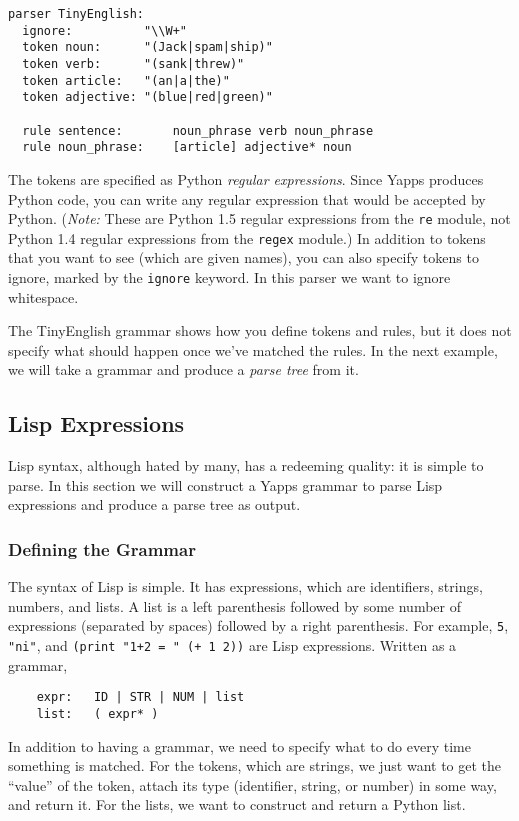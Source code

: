 \documentclass[10pt]{article}
\newcommand{\mysubsection}[1]{\subsection{#1}}
\begin{document}
\begin{verbatim}
parser TinyEnglish:
  ignore:          "\\W+"
  token noun:      "(Jack|spam|ship)"
  token verb:      "(sank|threw)"
  token article:   "(an|a|the)"
  token adjective: "(blue|red|green)"

  rule sentence:       noun_phrase verb noun_phrase
  rule noun_phrase:    [article] adjective* noun
\end{verbatim}

The tokens are specified as Python \emph{regular expressions}.  Since
Yapps produces Python code, you can write any regular expression that
would be accepted by Python.  (\emph{Note:} These are Python 1.5
regular expressions from the \texttt{re} module, not Python 1.4
regular expressions from the \texttt{regex} module.)  In addition to
tokens that you want to see (which are given names), you can also
specify tokens to ignore, marked by the \texttt{ignore} keyword.  In
this parser we want to ignore whitespace.

The TinyEnglish grammar shows how you define tokens and rules, but it
does not specify what should happen once we've matched the rules.  In
the next example, we will take a grammar and produce a \emph{parse
tree} from it.

\mysubsection{Lisp Expressions}

Lisp syntax, although hated by many, has a redeeming quality: it is
simple to parse.  In this section we will construct a Yapps grammar to
parse Lisp expressions and produce a parse tree as output.

\subsubsection*{Defining the Grammar}

The syntax of Lisp is simple.  It has expressions, which are
identifiers, strings, numbers, and lists.  A list is a left
parenthesis followed by some number of expressions (separated by
spaces) followed by a right parenthesis.  For example, \verb|5|,
\verb|"ni"|, and \verb|(print "1+2 = " (+ 1 2))| are Lisp expressions.
Written as a grammar,

\begin{verbatim}
    expr:   ID | STR | NUM | list
    list:   ( expr* )  
\end{verbatim}

In addition to having a grammar, we need to specify what to do every
time something is matched.  For the tokens, which are strings, we just
want to get the ``value'' of the token, attach its type (identifier,
string, or number) in some way, and return it.  For the lists, we want
to construct and return a Python list.
\end{document}
